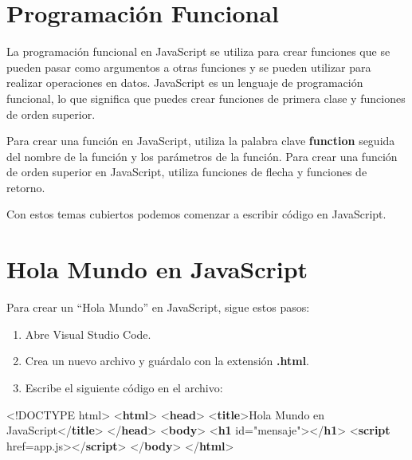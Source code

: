\documentclass[
  a4paper,
  DIV=11,
  numbers=noendperiod,
  onepage,
  openany]{scrreprt}
\newenvironment{Shaded}{\begin{snugshade}}{\end{snugshade}}
\newcommand{\DataTypeTok}[1]{\textcolor[rgb]{0.68,0.00,0.00}{#1}}
\newcommand{\KeywordTok}[1]{\textcolor[rgb]{0.00,0.23,0.31}{\textbf{#1}}}
\newcommand{\NormalTok}[1]{\textcolor[rgb]{0.00,0.23,0.31}{#1}}
\newcommand{\OperatorTok}[1]{\textcolor[rgb]{0.37,0.37,0.37}{#1}}
\newcommand{\OtherTok}[1]{\textcolor[rgb]{0.00,0.23,0.31}{#1}}
\newcommand{\StringTok}[1]{\textcolor[rgb]{0.13,0.47,0.30}{#1}}
\begin{document}
\begin{tcolorbox}
\section{Programación Funcional}\label{programaciuxf3n-funcional}

La programación funcional en JavaScript se utiliza para crear funciones
que se pueden pasar como argumentos a otras funciones y se pueden
utilizar para realizar operaciones en datos. JavaScript es un lenguaje
de programación funcional, lo que significa que puedes crear funciones
de primera clase y funciones de orden superior.

Para crear una función en JavaScript, utiliza la palabra clave
\textbf{function} seguida del nombre de la función y los parámetros de
la función. Para crear una función de orden superior en JavaScript,
utiliza funciones de flecha y funciones de retorno.

Con estos temas cubiertos podemos comenzar a escribir código en
JavaScript.

\section{Hola Mundo en JavaScript}\label{hola-mundo-en-javascript}

Para crear un ``Hola Mundo'' en JavaScript, sigue estos pasos:

\begin{enumerate}
\def\labelenumi{\arabic{enumi}.}
\item
  Abre Visual Studio Code.
\item
  Crea un nuevo archivo y guárdalo con la extensión \textbf{.html}.
\item
  Escribe el siguiente código en el archivo:
\end{enumerate}

\begin{Shaded}
\begin{Highlighting}[]
\DataTypeTok{\textless{}!DOCTYPE}\NormalTok{ html}\DataTypeTok{\textgreater{}}
\DataTypeTok{\textless{}}\KeywordTok{html}\DataTypeTok{\textgreater{}}
\DataTypeTok{\textless{}}\KeywordTok{head}\DataTypeTok{\textgreater{}}
    \DataTypeTok{\textless{}}\KeywordTok{title}\DataTypeTok{\textgreater{}}\NormalTok{Hola Mundo en JavaScript}\DataTypeTok{\textless{}/}\KeywordTok{title}\DataTypeTok{\textgreater{}}
\DataTypeTok{\textless{}/}\KeywordTok{head}\DataTypeTok{\textgreater{}}
\DataTypeTok{\textless{}}\KeywordTok{body}\DataTypeTok{\textgreater{}}
    \DataTypeTok{\textless{}}\KeywordTok{h1}\OtherTok{ id}\OperatorTok{=}\StringTok{"mensaje"}\DataTypeTok{\textgreater{}\textless{}/}\KeywordTok{h1}\DataTypeTok{\textgreater{}}
    \DataTypeTok{\textless{}}\KeywordTok{script}\OtherTok{ href}\OperatorTok{=}\StringTok{\textquotesingle{}app.js\textquotesingle{}}\DataTypeTok{\textgreater{}\textless{}/}\KeywordTok{script}\DataTypeTok{\textgreater{}}
\DataTypeTok{\textless{}/}\KeywordTok{body}\DataTypeTok{\textgreater{}}
\DataTypeTok{\textless{}/}\KeywordTok{html}\DataTypeTok{\textgreater{}}
\end{Highlighting}
\end{Shaded}


\end{tcolorbox}
\end{document}
